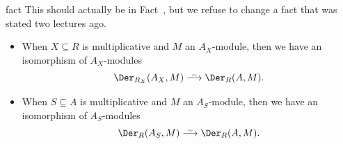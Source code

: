 \documentclass[a4paper,parskip=half,numbers=enddot, DIV=12, headheight=30pt]{scrreprt}
\begin{document}
\begin{varthm}{fact}
	This should actually be in Fact~, but we refuse to change a fact that was stated two lectures ago.
    \begin{itemize}
      \item[\itememph{c}]
        When $X\subseteq R$ is multiplicative and $M$ an $A_X$-module, then we have an isomorphism of $A_X$-modules
        \begin{align}\lbl{eq:DerLocalizationIso1}
            \Der_{R_X}(A_X,M) \isomorphism \Der_R(A,M).
        \end{align}
      \item[\itememph{d}]
        When $S\subseteq A$ is multiplicative and $M$ an $A_S$-module, then we have an isomorphism of $A_S$-modules
        \begin{align}\lbl{eq:DerLocalizationIso2}
            \Der_R(A_S,M)\isomorphism \Der_R(A,M).
        \end{align}
    \end{itemize}
\end{varthm} 
\end{document}
